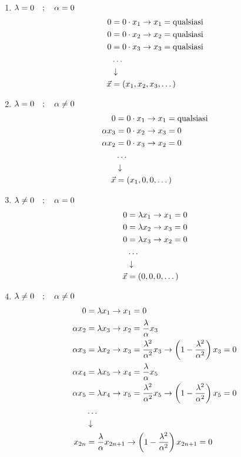 \begin{enumerate}
	\item $\lambda = 0 \quad ; \quad \alpha =0$
		\begin{align}
			0 &= 0\cdot x_1 \to x_1 = \text{qualsiasi} \\
			0 &= 0\cdot x_2 \to x_2=\text{qualsiasi}\\
			0 &= 0\cdot x_3 \to x_3=\text{qualsiasi} \\
			&\dots \\ &\downarrow \nonumber \\
			\vec{x} &= (x_1,x_2, x_3, \dots)
		\end{align}
	\item $\lambda = 0 \quad ; \quad \alpha \neq 0$
		\begin{align}
			0 &= 0\cdot x_1 \to x_1 = \text{qualsiasi} \\
			\alpha x_3 &= 0\cdot x_2 \to x_3=0\\
			\alpha x_2 &= 0\cdot x_3 \to x_2=0 \\
			&\dots \\ &\downarrow \nonumber \\
			\vec{x} &= (x_1,0, 0, \dots)
		\end{align}
	\item $\lambda \neq 0 \quad ; \quad \alpha =0$
		\begin{align}
			0 &= \lambda x_1 \to x_1=0 \\
			0 &= \lambda x_2 \to x_3=0\\
			0 &= \lambda x_3 \to x_2=0 \\
			&\dots \\ &\downarrow \nonumber \\
			\vec{x} &= (0,0, 0, \dots)
		\end{align}
	\item $\lambda \neq 0 \quad ; \quad \alpha \neq 0$
		\begin{align}
			0 &= \lambda x_1 \to x_1=0 \\
			\alpha x_2 &= \lambda x_3 \to x_2=\frac{\lambda}{\alpha} x_3\\
			\alpha x_3 &= \lambda x_2 \to x_3=\frac{\lambda^2}{\alpha^2} x_3 \to \left(1 - \frac{\lambda^2}{\alpha^2}\right) x_3 = 0 \\
			\alpha x_4 &= \lambda x_5 \to x_4=\frac{\lambda}{\alpha} x_5\\
			\alpha x_5 &= \lambda x_4 \to x_5=\frac{\lambda^2}{\alpha^2} x_5 \to \left(1 - \frac{\lambda^2}{\alpha^2}\right) x_5 = 0\\
			&\dots \\ &\downarrow \nonumber \\
			x_{2n} &=\frac{\lambda}{\alpha} x_{2n+1} \to \left(1 - \frac{\lambda^2}{\alpha^2}\right) x_{2n+1} = 0 
		\end{align}
	

\end{enumerate}
